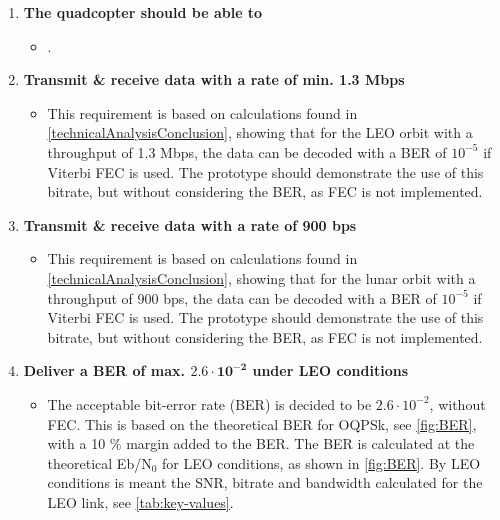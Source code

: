 \begin{enumerate}[label=\textbf{\arabic*})]
\item \textbf{The quadcopter should be able to }
\begin{itemize}
\item[] .
\end{itemize}

\item \textbf{Transmit \& receive data with a rate of min. 1.3 Mbps}
\begin{itemize}
\item[] This requirement is based on calculations found in \autoref{technicalAnalysisConclusion}, showing that for the LEO orbit with a throughput of 1.3 Mbps, the data can be decoded with a BER of ${10^{-5}}$ if Viterbi FEC is used. The prototype should demonstrate the use of this bitrate, but without considering the BER, as FEC is not implemented.
\end{itemize}

\item \textbf{Transmit \& receive data with a rate of 900 bps}
\begin{itemize}
\item[] This requirement is based on calculations found in \autoref{technicalAnalysisConclusion}, showing that for the lunar orbit with a throughput of 900 bps, the data can be decoded with a BER of ${10^{-5}}$ if Viterbi FEC is used. The prototype should demonstrate the use of this bitrate, but without considering the BER, as FEC is not implemented.
\end{itemize}

\item \textbf{Deliver a BER of max. $\mathbf{2.6\cdot10^{-2}}$ under LEO conditions}
\begin{itemize}
\item[] The acceptable bit-error rate (BER) is decided to be $2.6\cdot10^{-2}$, without FEC. This is based on the theoretical BER for OQPSk, see \autoref{fig:BER}, with a 10 \% margin added to the BER. The BER is calculated at the theoretical Eb/N$_0$ for LEO conditions, as shown in \autoref{fig:BER}. By LEO conditions is meant the SNR, bitrate and bandwidth calculated for the LEO link, see \autoref{tab:key-values}.
\end{itemize}


\end{enumerate}
